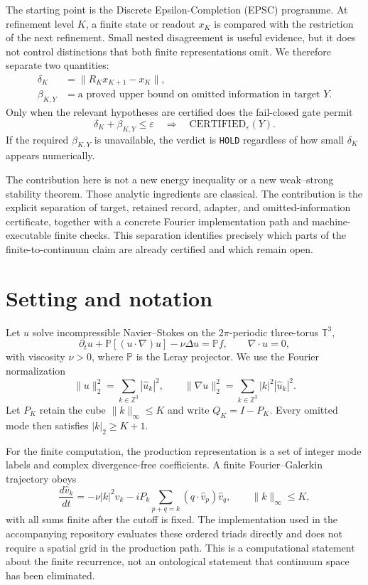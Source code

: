 \documentclass[11pt]{article}
\theoremstyle{definition}
\newcommand{\eps}{\varepsilon}
\newcommand{\Torus}{\mathbb T^3}
\begin{document}
The starting point is the Discrete Epsilon-Completion (EPSC) programme.  At refinement level $K$,
a finite state or readout $x_K$ is compared with the restriction of the next refinement.  Small
nested disagreement is useful evidence, but it does not control distinctions that both finite
representations omit.  We therefore separate two quantities:
\begin{align}
\delta_K &= \|R_K x_{K+1}-x_K\|, \\
\beta_{K,Y} &= \text{a proved upper bound on omitted information in target }Y.
\end{align}
Only when the relevant hypotheses are certified does the fail-closed gate permit
\[
\delta_K+\beta_{K,Y}\le\eps
\quad\Longrightarrow\quad
\mathrm{CERTIFIED}_\eps(Y).
\]
If the required $\beta_{K,Y}$ is unavailable, the verdict is \texttt{HOLD} regardless of how small
$\delta_K$ appears numerically.

The contribution here is not a new energy inequality or a new weak--strong stability theorem.
Those analytic ingredients are classical.  The contribution is the explicit separation of target,
retained record, adapter, and omitted-information certificate, together with a concrete Fourier
implementation path and machine-executable finite checks.  This separation identifies precisely
which parts of the finite-to-continuum claim are already certified and which remain open.

\section{Setting and notation}

Let $u$ solve incompressible Navier--Stokes on the $2\pi$-periodic three-torus $\Torus$,
\begin{equation}\label{eq:NS}
\partial_t u + \mathbb P[(u\cdot\nabla)u] - \nu\Delta u = \mathbb P f,
\qquad \nabla\cdot u=0,
\end{equation}
with viscosity $\nu>0$, where $\mathbb P$ is the Leray projector.  We use the Fourier
normalization
\[
\|u\|_2^2=\sum_{k\in\mathbb Z^3}|\widehat u_k|^2,
\qquad
\|\nabla u\|_2^2=\sum_{k\in\mathbb Z^3}|k|^2|\widehat u_k|^2.
\]
Let $P_K$ retain the cube $\|k\|_\infty\le K$ and write $Q_K=I-P_K$.  Every omitted mode then
satisfies $|k|_2\ge K+1$.

For the finite computation, the production representation is a set of integer mode labels and
complex divergence-free coefficients.  A finite Fourier--Galerkin trajectory obeys
\begin{equation}\label{eq:galerkin}
\frac{d\widehat v_k}{dt}
=-\nu|k|^2\widehat v_k
-iP_k\sum_{p+q=k}(q\cdot\widehat v_p)\widehat v_q,
\qquad \|k\|_\infty\le K,
\end{equation}
with all sums finite after the cutoff is fixed.  The implementation used in the accompanying
repository evaluates these ordered triads directly and does not require a spatial grid in the
production path.  This is a computational statement about the finite recurrence, not an
ontological statement that continuum space has been eliminated.
\end{document}
